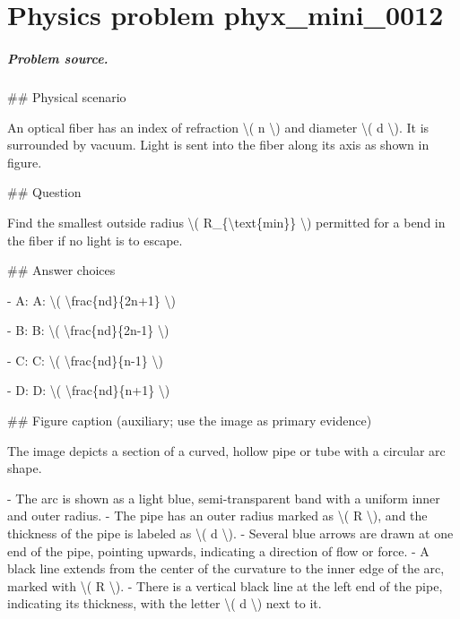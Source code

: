 
\chapter{Physics problem phyx\_mini\_0012}
\label{ch:PhyXMiniProblems_problem_phyx_mini_0012}

\paragraph{Problem source.}
\#\# Physical scenario

An optical fiber has an index of refraction \textbackslash{}( n \textbackslash{}) and diameter \textbackslash{}( d \textbackslash{}). It is surrounded by vacuum. Light is sent into the fiber along its axis as shown in figure.

\#\# Question

Find the smallest outside radius \textbackslash{}( R\_\{\textbackslash{}text\{min\}\} \textbackslash{}) permitted for a bend in the fiber if no light is to escape.

\#\# Answer choices

- A: A: \textbackslash{}( \textbackslash{}frac\{nd\}\{2n+1\} \textbackslash{})

- B: B: \textbackslash{}( \textbackslash{}frac\{nd\}\{2n-1\} \textbackslash{})

- C: C: \textbackslash{}( \textbackslash{}frac\{nd\}\{n-1\} \textbackslash{})

- D: D: \textbackslash{}( \textbackslash{}frac\{nd\}\{n+1\} \textbackslash{})

\#\# Figure caption (auxiliary; use the image as primary evidence)

The image depicts a section of a curved, hollow pipe or tube with a circular arc shape. 

- The arc is shown as a light blue, semi-transparent band with a uniform inner and outer radius.
- The pipe has an outer radius marked as \textbackslash{}( R \textbackslash{}), and the thickness of the pipe is labeled as \textbackslash{}( d \textbackslash{}).
- Several blue arrows are drawn at one end of the pipe, pointing upwards, indicating a direction of flow or force.
- A black line extends from the center of the curvature to the inner edge of the arc, marked with \textbackslash{}( R \textbackslash{}).
- There is a vertical black line at the left end of the pipe, indicating its thickness, with the letter \textbackslash{}( d \textbackslash{}) next to it.

